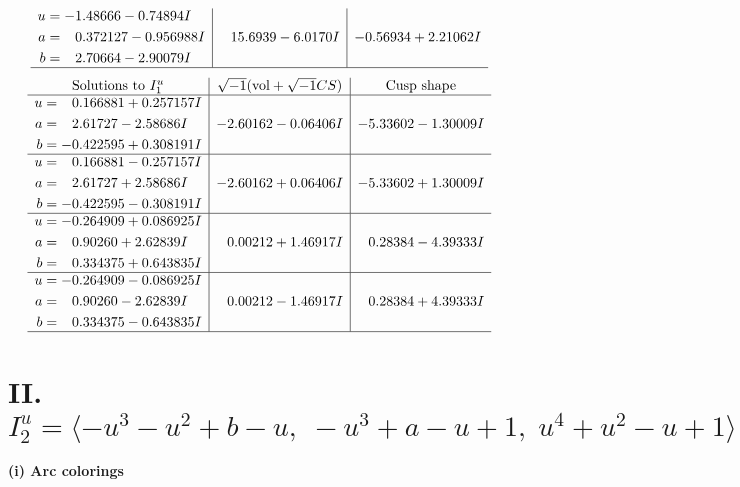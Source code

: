 \documentclass[1p]{elsarticle_modified}
\theoremstyle{definition}
\newcommand{\I}{\sqrt{-1}}
\begin{document}
$$\begin{array}{c|c|c}
\begin{aligned}
u &= -1.48666 - 0.74894 I \\
a &= \phantom{-}0.372127 - 0.956988 I \\
b &= \phantom{-}2.70664 - 2.90079 I\end{aligned}
 & \phantom{-}15.6939 - 6.0170 I & -0.56934 + 2.21062 I\\
 \hline 
 \end{array}$$\newpage$$\begin{array}{c|c|c}  
\text{Solutions to }I^u_{1}& \I (\text{vol} + \sqrt{-1}CS) & \text{Cusp shape}\\
 \hline 
\begin{aligned}
u &= \phantom{-}0.166881 + 0.257157 I \\
a &= \phantom{-}2.61727 - 2.58686 I \\
b &= -0.422595 + 0.308191 I\end{aligned}
 & -2.60162 - 0.06406 I & -5.33602 - 1.30009 I \\ \hline\begin{aligned}
u &= \phantom{-}0.166881 - 0.257157 I \\
a &= \phantom{-}2.61727 + 2.58686 I \\
b &= -0.422595 - 0.308191 I\end{aligned}
 & -2.60162 + 0.06406 I & -5.33602 + 1.30009 I \\ \hline\begin{aligned}
u &= -0.264909 + 0.086925 I \\
a &= \phantom{-}0.90260 + 2.62839 I \\
b &= \phantom{-}0.334375 + 0.643835 I\end{aligned}
 & \phantom{-}0.00212 + 1.46917 I & \phantom{-}0.28384 - 4.39333 I \\ \hline\begin{aligned}
u &= -0.264909 - 0.086925 I \\
a &= \phantom{-}0.90260 - 2.62839 I \\
b &= \phantom{-}0.334375 - 0.643835 I\end{aligned}
 & \phantom{-}0.00212 - 1.46917 I & \phantom{-}0.28384 + 4.39333 I\\
 \hline 
 \end{array}$$\newpage\newpage\renewcommand{\arraystretch}{1}
\centering \section*{II. $I^u_{2}= \langle - u^3- u^2+b- u,\;- u^3+a- u+1,\;u^4+u^2- u+1 \rangle$}
\flushleft \textbf{(i) Arc colorings}\\
\end{document}
